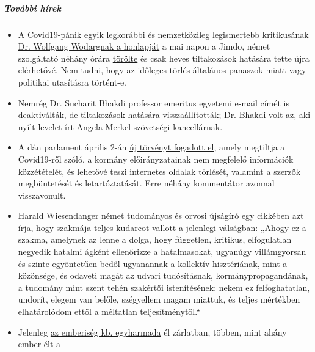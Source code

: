 \hypertarget{tovuxe1bbi-huxedrek}{%
\subparagraph{\texorpdfstring{\textbf{További
hírek}}{További hírek}}\label{tovuxe1bbi-huxedrek}}

\begin{itemize}
\tightlist
\item
  A Covid19-pánik egyik legkorábbi és nemzetközileg legismertebb
  kritikusának \href{http://wodarg.com/}{Dr. Wolfgang Wodargnak a
  honlapját} a mai napon a Jimdo, német szolgáltató néhány órára
  \href{https://twitter.com/wodarg}{törölte} és csak heves tiltakozások
  hatására tette újra elérhetővé. Nem tudni, hogy az időleges törlés
  általános panaszok miatt vagy politikai utasításra történt-e.
\item
  Nemrég Dr. Sucharit Bhakdi professor emeritus egyetemi e-mail címét is
  deaktiválták, de tiltakozások hatására visszaállították; Dr. Bhakdi
  volt az, aki
  \href{https://swprs.org/offener-brief-von-professor-sucharit-bhakdi-an-bundeskanzlerin-dr-angela-merkel/}{nyílt
  levelet írt Angela Merkel szövetségi kancellárnak}.
\item
  A dán parlament április 2-án
  \href{https://newsvoice.se/2020/04/danmark-forbjuder-corona-policy/}{új
  törvényt fogadott el}, amely megtiltja a Covid19-ről szóló, a kormány
  előirányzatainak nem megfelelő információk közzétételét, és lehetővé
  teszi internetes oldalak törlését, valamint a szerzők megbüntetését és
  letartóztatását. Erre néhány kommentátor azonnal visszavonult.
\item
  Harald Wiesendanger német tudományos és orvosi újságíró egy cikkében
  azt írja, hogy
  \href{https://www.nachrichten-fabrik.de/news/harald-wiesendanger-ueber-die-massenmedien-waehrend-der-corona-krise-ich-schaeme-mich---meines-berufsstands-152103}{szakmája
  teljes kudarcot vallott a jelenlegi válságban}: „Ahogy ez a szakma,
  amelynek az lenne a dolga, hogy független, kritikus, elfogulatlan
  negyedik hatalmi ágként ellenőrizze a hatalmasokat, ugyanúgy
  villámgyorsan és szinte egyöntetűen bedől ugyanannak a kollektív
  hisztériának, mint a közönsége, és odaveti magát az udvari
  tudósításnak, kormánypropagandának, a tudomány mint szent tehén
  szakértői istenítésének: nekem ez felfoghatatlan, undorít, elegem van
  belőle, szégyellem magam miattuk, és teljes mértékben elhatárolódom
  ettől a méltatlan teljesítménytől.``
\item
  Jelenleg
  \href{https://www.sciencealert.com/one-third-of-the-world-s-population-are-now-restricted-in-where-they-can-go}{az
  emberiség kb. egyharmada} él zárlatban, többen, mint ahány ember élt a

\end{itemize}

